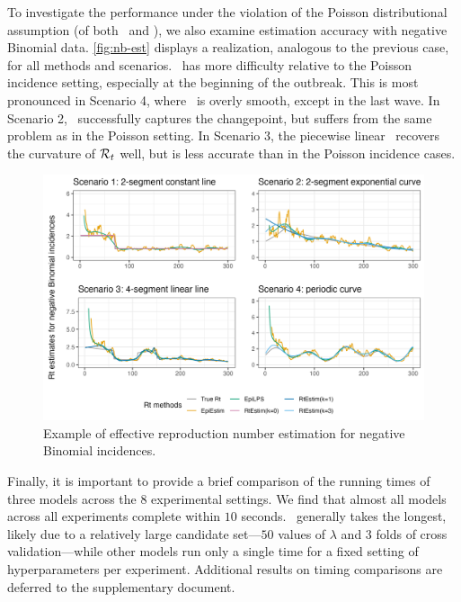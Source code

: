 To investigate the performance under the violation of the Poisson distributional
assumption (of both \RtEstim\ and \EpiEstim), we also examine estimation
accuracy with negative Binomial data. \autoref{fig:nb-est} displays a
realization, analogous to the previous case, for all methods and scenarios.
\RtEstim\ has more difficulty relative to the Poisson incidence setting,
especially at the beginning of the outbreak. This is most pronounced in Scenario
4, where \RtEstim\ is overly smooth, except in the last wave. In Scenario 2,
\RtEstim\ successfully captures the changepoint, but suffers from the same
problem as in the Poisson setting. In Scenario 3, the piecewise linear \RtEstim\
recovers the curvature of $\mathcal{R}_t$ well, but is less accurate than
in the Poisson incidence cases.

\begin{figure}[tb]
    \centering
    \includegraphics*[width=.99\textwidth]{fig/NB-res-plot.png}
    \caption{Example of effective reproduction number estimation for negative Binomial
    incidences.}
    \label{fig:nb-est}
\end{figure}

Finally, it is important to provide a brief comparison of the running times of
three models across the $8$ experimental settings. We find that almost all
models across all experiments complete within $10$ seconds.
\RtEstim\ generally takes the longest, likely due to a relatively large
candidate set---$50$ values of $\lambda$ and 3 folds of cross validation---while
other models run only a single time for a fixed setting of hyperparameters per
experiment. Additional results on timing comparisons are deferred to the
supplementary document. 


